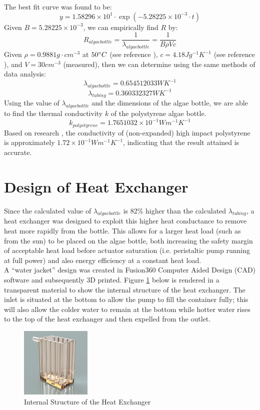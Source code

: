 \documentclass[10pt,a4paper]{IEEEtran}
\begin{document}
	The best fit curve was found to be: 
	$$y = 1.58296 \times 10^{1} \cdot \exp(-5.28225\times 10^{-3}\cdot t)$$
	Given $B = 5.28225\times 10^{-3}$, we can empirically find $R$ by:
	$$R_{algae bottle} = \frac{1}{\lambda_{algae bottle}} = \frac{1}{B \rho V c}$$
	Given $\rho = 0.9881 g \cdot cm^{-3}$ at $50 \degree C$ (see reference \cite{waterDensity}), $c = 4.18 J g^{-1} K^{-1}$ (see reference \cite{waterHeatCap}), and $V = 30 cm^{-3}$ (measured), then we can determine using the same methods of data analysis:
	$$\lambda_{algae bottle} = 0.654512033 W K^{-1}$$
	$$\lambda_{tubing} = 0.360332327W K^{-1}$$
	Using the value of $\lambda_{algae bottle}$ and the dimensions of the algae bottle, we are able to find the thermal conductivity $k$ of the polystyrene \cite{polystyreneBottle} algae bottle.
	$$k_{polystyrene} = 1.7651032 \times 10^{-1} W m^{-1} K^{-1}$$
	Based on research \cite{polystyreneConductivity}, the conductivity of (non-expanded) high impact polystyrene is approximately $1.72 \times 10^{-1} W m^{-1} K^{-1}$, indicating that the result attained is accurate.
	
	
 	\section{Design of Heat Exchanger}
 	Since the calculated value of $\lambda_{algae bottle}$ is 82\% higher than the calculated $\lambda_{tubing}$, a heat exchanger was designed to exploit this higher heat conductance to remove heat more rapidly from the bottle. This allows for a larger heat load (such as from the sun) to be placed on the algae bottle, both increasing the safety margin of acceptable heat load before actuator saturation (i.e. peristaltic pump running at full power) and also energy efficiency at a constant heat load.\\
 	
 	A ``water jacket'' design was created in Fusion360 Computer Aided Design (CAD) software and subsequently 3D printed. Figure \ref{fig:heat_exchanger_side} below is rendered in a transparent material to show the internal structure of the heat exchanger. The inlet is situated at the bottom to allow the pump to fill the container fully; this will also allow the colder water to remain at the bottom while hotter water rises to the top of the heat exchanger and then expelled from the outlet.
 		\begin{figure}[H]
 			\begin{center}
 				\includegraphics[width=0.3\textwidth]{heat_exchanger_side.png}
 				\caption{Internal Structure of the Heat Exchanger}
 				\label{fig:heat_exchanger_side}
 			\end{center}
 		\end{figure}
 	
\end{document}
